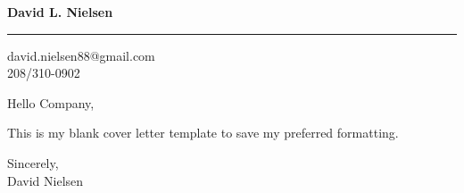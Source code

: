 \documentclass{letter} %
\begin{document}
\longindentation=0pt                       %
\let\raggedleft\raggedright                %
 \date{}
 
\begin{letter}{
}


\begin{flushleft}
{\large\bf David L. Nielsen}
\end{flushleft}
\medskip\hrule height 1pt
\begin{flushright}
\hfill david.nielsen88@gmail.com \\
\hfill 208/310-0902
\end{flushright} 
\opening{Hello Company, }

\noindent This is my blank cover letter template to save my preferred formatting.
					
\noindent 
					
 
\closing{Sincerely,
\\David Nielsen} 





\end{letter}
 
\end{document}
